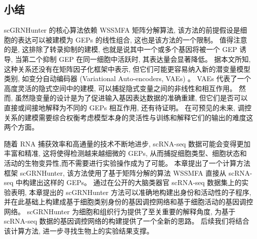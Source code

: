 




\subsection{小结}
scGRNHunter 的核心算法依赖 WSSMFA 矩阵分解算法,
该方法的前提假设是细胞的表达可以被建模为 GEPs 的线性组合,
这也是该方法的一个限制。
值得注意的是, 这排除了转录抑制的建模, 也就是说其中一个或多个基因将被一个 GEP 诱导,
当第二个抑制 GEP 在同一细胞中活跃时, 其表达量会显著降低。
据本文所知, 这种关系还没有在矩阵因子化框架中表示, 但它们可能更容易纳入新的潜变量模型类别,
如变分自动编码器 (Variational Auto-encoders, VAEs) 。
VAEs 代表了一个高度灵活的隐式空间中的建模, 可以捕捉隐式变量之间的非线性和相互作用。
然而, 虽然隐变量的设计是为了促进输入基因表达数据的准确重建, 
但它们是否可以直接或间接地解释为不同的 GEPs 相互作用, 还有待证明。
在可预见的未来, 调控关系的建模需要综合权衡考虑模型本身的灵活性与训练和解释它们的输出的难度这两个方面。

随着 RNA 捕获效率和高通量的技术不断地进步, scRNA-seq 数据可能会变得更加丰富和精准,
这将使得检测越来越细微的 GEPs, 从而捕捉细胞类型、细胞状态和活动的生物变异性,而不需要进行实验操作成为了可能。
本章提出了一个计算方法框架 scGRNHunter,
该方法使用了基于矩阵分解的算法 WSSMFA 直接从 scRNA-seq 中构建出这样的 GEPs。 
通过在公开的大脑类器官 scRNA-seq 数据集上的实验表明,
本章提出的 scGRNHunter 方法可以准确地构建出身份和活动性的子程序, 
并在此基础上构建成基于细胞类别身份的基因调控网络和基于细胞活动的基因调控网络。
scGRNHunter 为细胞和组织行为提供了至关重要的解释角度,
为基于 scRNA-seq 数据的基因调控网络的构建提供了一个全新的思路。
后续我们将结合该计算方法, 进一步寻找生物上的实验结果支撑。